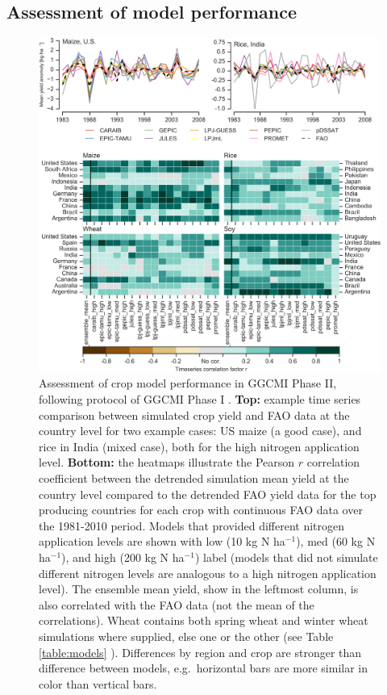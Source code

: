 \documentclass[gmd, manuscript]{copernicus} %
\begin{document}
\subsection{Assessment of model performance}
\begin{figure}[ht]
    \centering
    \includegraphics[width=14cm]{figures/Agformet_validation.png}
    \caption{Assessment of crop model performance in GGCMI Phase II, following protocol of GGCMI Phase I \citep{muller_global_2017}. 
    \textbf{Top:} example time series comparison between simulated crop yield and FAO data \citep{FAOSTAT} at the country level for two example cases: US maize (a good case), and rice in India (mixed case), both for the high nitrogen application level. 
    \textbf{Bottom:} the heatmaps illustrate the Pearson $r$ correlation coefficient between the detrended simulation mean yield at the country level compared to the detrended FAO yield data for the top producing countries for each crop with continuous FAO data over the 1981-2010 period. 
    Models that provided different nitrogen application levels are shown with low (10 kg N ha$^{-1}$), med (60 kg N ha$^{-1}$), and high (200 kg N ha$^{-1}$) label (models that did not simulate different nitrogen levels are analogous to a high nitrogen application level). 
    The ensemble mean yield, show in the leftmost column, is also correlated with the FAO data (not the mean of the correlations). 
    Wheat contains both spring wheat and winter wheat simulations where supplied, else one or the other (see Table \ref{table:models} ). 
    Differences by region and crop are stronger than difference between models, e.g.\ horizontal bars are more similar in color than vertical bars.}
    \label{fig:simulation_val}
\end{figure}
\end{document}

